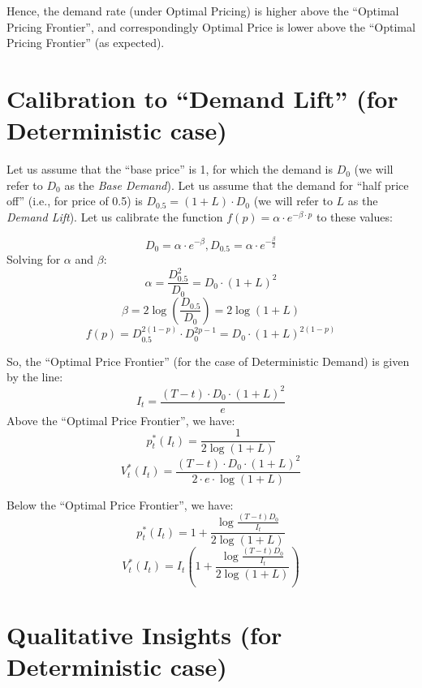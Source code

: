 \documentclass[12pt]{amsart}
\begin{document}
Hence, the demand rate (under Optimal Pricing) is higher above the ``Optimal Pricing Frontier'', and correspondingly Optimal Price is lower above the ``Optimal Pricing Frontier'' (as expected). 
   
 \section{Calibration to ``Demand Lift'' (for Deterministic case)}
   
Let us assume that the ``base price'' is 1, for which the demand is $D_0$ (we will refer to $D_0$ as the {\em Base Demand}). Let us assume that the demand for ``half price off'' (i.e., for price of 0.5) is $D_{0.5} = (1+L)\cdot D_0$ (we will refer to $L$ as the {\em Demand Lift}). Let us calibrate the function $f(p) = \alpha \cdot e^{-\beta \cdot p}$ to these values:
   
$$D_0 = \alpha \cdot e^{-\beta}, D_{0.5} = \alpha \cdot e^{-\frac {\beta} 2}$$
Solving for $\alpha$ and $\beta$:
$$\alpha = \frac {D_{0.5}^2} {D_0} = D_0 \cdot (1+L)^2$$
$$\beta = 2 \log{(\frac {D_{0.5}} {D_0})} = 2 \log{(1 + L)}$$
$$f(p) = D_{0.5}^{2(1-p)} \cdot D_0^{2p-1} = D_0 \cdot (1+L)^{2(1-p)}$$

So, the ``Optimal Price Frontier'' (for the case of Deterministic Demand) is given by the line:
$$I_t = \frac {(T-t) \cdot D_0 \cdot (1+L)^2} {e}$$
Above the ``Optimal Price Frontier'', we have:
$$p_t^*(I_t) = \frac 1 {2 \log{(1+L)}}$$
$$V_t^*(I_t) = \frac {(T-t) \cdot D_0 \cdot (1+L)^2} {2 \cdot e \cdot \log{(1+L)}} $$

Below the ``Optimal Price Frontier'', we have:
$$p_t^*(I_t) = 1 + \frac {\log \frac {(T-t)D_0} {I_t}} {2 \log (1+L)}$$
$$V_t^*(I_t) = I_t(1 + \frac {\log \frac {(T-t)D_0} {I_t}} {2 \log (1+L)}) $$

\section{Qualitative Insights (for Deterministic case)}
\end{document}
